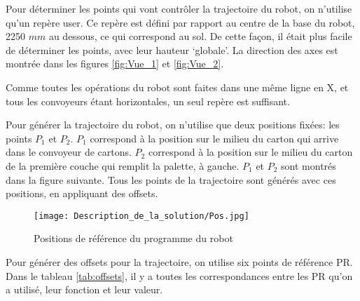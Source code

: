 
Pour déterminer les points qui vont contrôler la trajectoire du robot, on n’utilise qu’un repère user. Ce repère est défini par rapport au centre de la base du robot, 2250 $ mm $ au dessous, ce qui correspond au sol. De cette façon, il était plus facile de déterminer les points, avec leur hauteur ‘globale’. La direction des axes est montrée dans les figures \ref{fig:Vue_1} et \ref{fig:Vue_2}.


Comme toutes les opérations du robot sont faites dans une même ligne en X, et tous les convoyeurs étant horizontales, un seul repère est suffisant.

Pour générer la trajectoire du robot, on n’utilise que deux positions fixées: les points $ P_1 $ et $ P_2 $. $P_1$ correspond à la position sur le milieu du carton qui arrive dans le convoyeur de cartons. $P_2$ correspond à la position sur le milieu du carton de la première couche qui remplit la palette, à gauche. $P_1$ et $P_2$ sont montrés dans la figure suivante. Tous les points de la trajectoire sont générés avec ces positions, en appliquant des offsets.

\begin{figure}[H]
	\begin{center}	
		\texttt{[image: Description\_de\_la\_solution/Pos.jpg]}
		\caption{Positions de référence du programme du robot}
		\label{fig:Pos}
	\end{center}
\end{figure}

Pour générer des offsets pour la trajectoire, on utilise six points de référence PR. Dans le tableau \ref{tab:offsets}, il y a toutes les correspondances entre les PR qu’on a utilisé, leur fonction et leur valeur.

